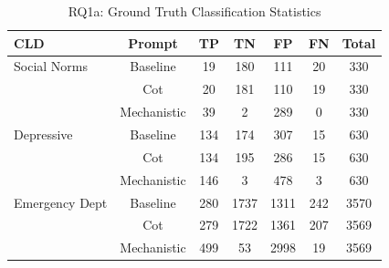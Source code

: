 \begin{table}[htbp]
\centering
\caption{RQ1a: Ground Truth Classification Statistics}
\label{tab:rq1a_gt_classification}
\begin{tabular}{lcccccc}
\toprule
\textbf{CLD} & \textbf{Prompt} & \textbf{TP} & \textbf{TN} & \textbf{FP} & \textbf{FN} & \textbf{Total} \\
\midrule
Social Norms & Baseline & 19 & 180 & 111 & 20 & 330 \\
 & Cot & 20 & 181 & 110 & 19 & 330 \\
 & Mechanistic & 39 & 2 & 289 & 0 & 330 \\
\midrule
Depressive & Baseline & 134 & 174 & 307 & 15 & 630 \\
 & Cot & 134 & 195 & 286 & 15 & 630 \\
 & Mechanistic & 146 & 3 & 478 & 3 & 630 \\
\midrule
Emergency Dept & Baseline & 280 & 1737 & 1311 & 242 & 3570 \\
 & Cot & 279 & 1722 & 1361 & 207 & 3569 \\
 & Mechanistic & 499 & 53 & 2998 & 19 & 3569 \\
\midrule
\bottomrule
\end{tabular}
\end{table}